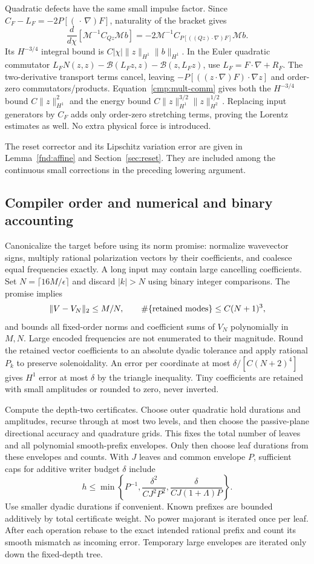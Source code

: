 \documentclass[11pt,a4paper]{amsart}
\theoremstyle{definition}
\theoremstyle{remark}
\numberwithin{equation}{section}
\newcommand{\Bcal}{\mathcal B}
\begin{document}
Quadratic defects have the same small impulse factor. Since
$C_F-L_F=-2P[(\,\cdot\,\nabla)F]$, naturality of the bracket gives
\[
 \frac d{d\chi}[\mathcal M^{-1}C_{Qz}\mathcal M b]
 =-2\mathcal M^{-1}C_{P[((Qz)\cdot\nabla)F]}\mathcal M b.
\]
Its $H^{-3/4}$ integral bound is
$C|\chi|\|z\|_{H^1}\|b\|_{H^1}$. In the Euler quadratic commutator
$L_FN(z,z)-\Bcal(L_Fz,z)-\Bcal(z,L_Fz)$, use
$L_F=F\cdot\nabla+R_F$. The two-derivative transport terms cancel, leaving
$-P[((z\cdot\nabla)F)\cdot\nabla z]$ and order-zero commutators/products.
Equation~\eqref{cmp:mult-comm} gives both the $H^{-3/4}$ bound
$C\|z\|_{H^1}^2$ and the energy bound
$C\|z\|_{H^1}^{3/2}\|z\|_{H^2}^{1/2}$. Replacing input generators by
$C_F$ adds only order-zero stretching terms, proving the Lorentz estimates
as well. No extra physical force is introduced.

The reset corrector and its Lipschitz variation error are given in Lemma~\ref{fnd:affine} and Section~\ref{sec:reset}. They are included among the continuous small corrections in the preceding lowering argument.

\subsection{Compiler order and numerical and binary accounting}
\label{cmp:cost}

Canonicalize the target before using its norm promise: normalize wavevector
signs, multiply rational polarization vectors by their coefficients, and
coalesce equal frequencies exactly. A long input may contain large
cancelling coefficients. Set $N=\lceil16M/\epsilon\rceil$ and discard
$|k|>N$ using binary integer comparisons. The promise implies
\[
 \|V-V_N\|_2\le M/N,\qquad
 \#\{\hbox{retained modes}\}\le C(N+1)^3,
\]
and bounds all fixed-order norms and coefficient sums of $V_N$ polynomially
in $M,N$. Large encoded frequencies are not enumerated to their magnitude.
Round the retained vector coefficients to an absolute dyadic tolerance and
apply rational $P_k$ to preserve solenoidality. An error per coordinate at
most $\delta/[C(N+2)^4]$ gives $H^1$ error at most $\delta$ by the triangle
inequality. Tiny coefficients are retained with small amplitudes or rounded
to zero, never inverted.

Compute the depth-two certificates. Choose outer quadratic hold durations
and amplitudes, recurse through at most two levels, and then choose the
passive-plane directional accuracy and quadrature grids. This fixes the
total number of leaves and all polynomial smooth-prefix envelopes. Only
then choose leaf durations from these envelopes and counts. With $J$ leaves
and common envelope $P$, sufficient caps for additive writer budget $\delta$
include
\[
 h\le\min\left\{P^{-1},\frac{\delta^2}{CJ^2P^2},
                         \frac{\delta}{CJ(1+\Lambda)P}\right\}.
\]
Use smaller dyadic durations if convenient. Known prefixes are bounded
additively by total certificate weight. No power majorant is iterated once
per leaf. After each operation rebase to the exact intended rational prefix
and count its smooth mismatch as incoming error. Temporary large envelopes
are iterated only down the fixed-depth tree.
\end{document}

